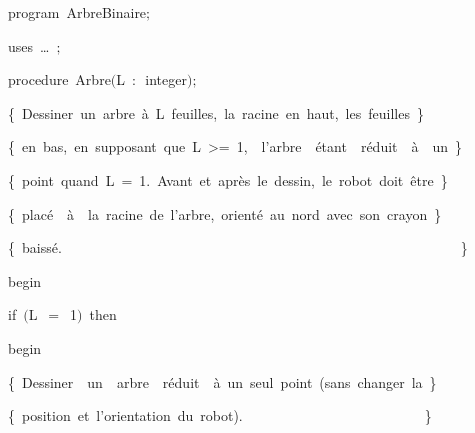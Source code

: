 
{
\parindent {}
\medskip

\carrenoir
\vspace{\neglskip}\mbox{\blc  \idt  \mcl program\idt\ ArbreBinaire$;$
}\par 
\vspace{\neglskip}\mbox{\blc \blk\idt \mcl uses\idt \ \ldots\ $;$
}\par 
\medskip

\pagebreak[3] 
\vspace{\neglskip}\mbox{\blc  \blk\idt  \mcl procedure\idt \ Arbre$($L\ $:$\ integer$)$$;$}\par 
\vspace{\neglskip}\mbox{\blc  \blk\blk\idt  \cmt  \{\ Dessiner\ un\ arbre\ à\ L\ feuilles,\ la\ racine\ en\ haut,\ les\ feuilles\ \}\idt }\par 
\vspace{\neglskip}\mbox{\blc  \blk\blk\idt  \cmt  \{\ en\ bas,\ en\ supposant\ que\ L\ >=\ 1,\ \ l{'}arbre\ \ étant\ \ réduit\ \ à\ \ un\ \}\idt }\par 
\vspace{\neglskip}\mbox{\blc  \blk\blk\idt  \cmt  \{\ point\ quand\ L\ =\ 1.\ Avant\ et\ après\ le\ dessin,\ le\ robot\ doit\ être\ \}\idt }\par 
\vspace{\neglskip}\mbox{\blc  \blk\blk\idt  \cmt  \{\ placé\ \ à\ \ la\ racine\ de\ l{'}arbre,\ orienté\ au\ nord\ avec\ son\ crayon\ \}\idt }\par 
\vspace{\neglskip}\mbox{\blc  \blk\blk\idt  \cmt  \{\ baissé.\ \ \ \ \ \ \ \ \ \ \ \ \ \ \ \ \ \ \ \ \ \ \ \ \ \ \ \ \ \ \ \ \ \ \ \ \ \ \ \ \ \ \ \ \ \ \ \ \ \ \ \ \ \ \ \ \ \}\idt }\par 
\vspace{\neglskip}\mbox{\blc  \blk\idt  \mcl begin\idt }\par 
\pagebreak[3] 
\vspace{\neglskip}\mbox{\blc  \blk\blk\idt  \mcl if\idt \ $($L\ $=$\ 1$)$\ \mcl then\idt }\par 
\vspace{\neglskip}\mbox{\blc  \blk\blk\blk\idt  \mcl begin\idt }\par 
\vspace{\neglskip}\mbox{\blc  \blk\blk\blk\blk\idt  \cmt  \{\ Dessiner\ \ un\ \ arbre\ \ réduit\ \ à\ un\ seul\ point\ (sans\ changer\ la\ \}\idt }\par 
\vspace{\neglskip}\mbox{\blc  \blk\blk\blk\blk\idt  \cmt  \{\ position\ et\ l{'}orientation\ du\ robot).\ \ \ \ \ \ \ \ \ \ \ \ \ \ \ \ \ \ \ \ \ \ \ \ \ \ \}\idt }\par 
}
